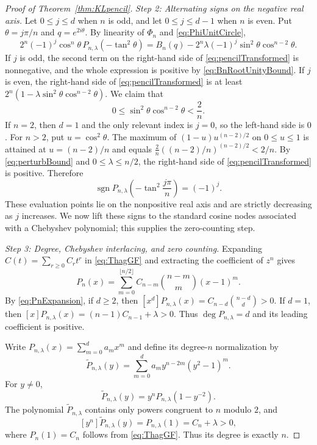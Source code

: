 \documentclass[10pt,a4paper]{amsart}
\DeclareMathOperator{\sgn}{sgn}
\begin{document}
\begin{proof}[Proof of Theorem~\ref{thm:KLpencil}]
\medskip
\noindent\emph{Step 2: Alternating signs on the negative real axis.}
Let $0\le j\le d$ when $n$ is odd, and let $0\le j\le d-1$ when
$n$ is even.  Put
$\theta=j\pi/n$ and $q=e^{2i\theta}$.  By linearity of $\Phi_n$ and
\eqref{eq:PhiUnitCircle},
\begin{equation}\label{eq:pencilTransformed}
2^n(-1)^j\cos^n\theta\,
P_{n,\lambda}(-\tan^2\theta)
=B_n(q)-2^n\lambda(-1)^j
\sin^2\theta\cos^{n-2}\theta.
\end{equation}
If $j$ is odd, the second term on the right-hand side of
\eqref{eq:pencilTransformed} is nonnegative, and the whole expression
is positive by \eqref{eq:BnRootUnityBound}.  If $j$ is even, the
right-hand side of \eqref{eq:pencilTransformed} is at least
$2^n(1-\lambda\sin^2\theta\cos^{n-2}\theta)$.  We claim that
\begin{equation}\label{eq:perturbBound}
0\le\sin^2\theta\cos^{n-2}\theta<\frac2n.
\end{equation}
If $n=2$, then $d=1$ and the only relevant index is $j=0$, so the
left-hand side is $0$.  For $n>2$, put
$u=\cos^2\theta$.  The maximum of
$(1-u)u^{(n-2)/2}$ on $0\le u\le1$ is attained at
$u=(n-2)/n$ and equals
$\frac2n((n-2)/n)^{(n-2)/2}<2/n$.  By
\eqref{eq:perturbBound} and $0\le\lambda\le n/2$, the right-hand
side of \eqref{eq:pencilTransformed} is positive.  Therefore
\begin{equation}\label{eq:pencilSign}
\sgn P_{n,\lambda}\!\left(-\tan^2\frac{j\pi}{n}\right)=(-1)^j.
\end{equation}
These evaluation points lie on the nonpositive real axis and are
strictly decreasing as $j$ increases.  We now lift these signs to the
standard cosine nodes associated with a Chebyshev polynomial; this
supplies the zero-counting step.

\medskip
\noindent\emph{Step 3: Degree, Chebyshev interlacing, and zero counting.}
Expanding $C(t)=\sum_{r\ge0}C_rt^r$ in \eqref{eq:ThagGF} and
extracting the coefficient of $z^n$ gives
\begin{equation}\label{eq:PnExpansion}
P_n(x)=\sum_{m=0}^{\lfloor n/2\rfloor}
C_{n-m}\binom{n-m}{m}(x-1)^m.
\end{equation}
By \eqref{eq:PnExpansion}, if $d\ge2$, then
$[x^d]P_{n,\lambda}(x)=C_{n-d}\binom{n-d}{d}>0$.  If $d=1$, then
$[x]P_{n,\lambda}(x)=(n-1)C_{n-1}+\lambda>0$.  Thus
$\deg P_{n,\lambda}=d$ and its leading coefficient is positive.

Write $P_{n,\lambda}(x)=\sum_{m=0}^d a_mx^m$ and define its
degree-$n$ normalization by
\begin{equation}\label{eq:normalizedP}
\widetilde P_{n,\lambda}(y)
=\sum_{m=0}^d a_m y^{n-2m}(y^2-1)^m.
\end{equation}
For $y\ne0$,
\begin{equation}\label{eq:normalizedPRational}
\widetilde P_{n,\lambda}(y)
=y^nP_{n,\lambda}(1-y^{-2}).
\end{equation}
The polynomial $\widetilde P_{n,\lambda}$ contains only powers
congruent to $n$ modulo $2$, and
\[
[y^n]\widetilde P_{n,\lambda}(y)
=P_{n,\lambda}(1)=C_n+\lambda>0,
\]
where $P_n(1)=C_n$ follows from \eqref{eq:ThagGF}.  Thus its degree
is exactly $n$.


\end{proof}
\end{document}
